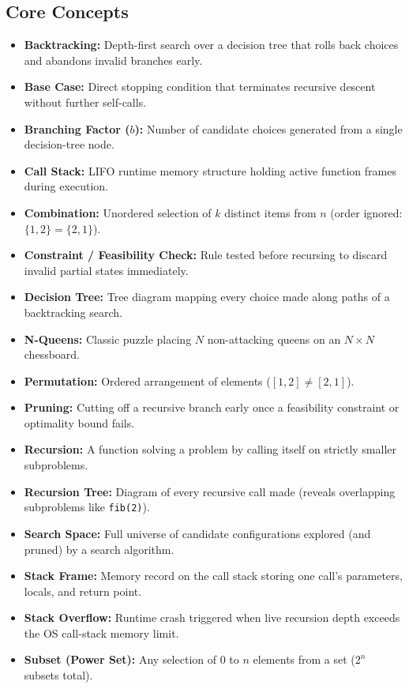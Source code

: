 \documentclass[11pt,a4paper]{article}
\theoremstyle{definition}
\begin{document}
\subsection*{Core Concepts}
\begin{itemize}
    \item \textbf{Backtracking:} Depth-first search over a decision tree that rolls back choices and abandons invalid branches early.
    \item \textbf{Base Case:} Direct stopping condition that terminates recursive descent without further self-calls.
    \item \textbf{Branching Factor ($b$):} Number of candidate choices generated from a single decision-tree node.
    \item \textbf{Call Stack:} LIFO runtime memory structure holding active function frames during execution.
    \item \textbf{Combination:} Unordered selection of $k$ distinct items from $n$ (order ignored: $\{1, 2\} = \{2, 1\}$).
    \item \textbf{Constraint / Feasibility Check:} Rule tested before recursing to discard invalid partial states immediately.
    \item \textbf{Decision Tree:} Tree diagram mapping every choice made along paths of a backtracking search.
    \item \textbf{N-Queens:} Classic puzzle placing $N$ non-attacking queens on an $N \times N$ chessboard.
    \item \textbf{Permutation:} Ordered arrangement of elements ($[1, 2] \neq [2, 1]$).
    \item \textbf{Pruning:} Cutting off a recursive branch early once a feasibility constraint or optimality bound fails.
    \item \textbf{Recursion:} A function solving a problem by calling itself on strictly smaller subproblems.
    \item \textbf{Recursion Tree:} Diagram of every recursive call made (reveals overlapping subproblems like \texttt{fib(2)}).
    \item \textbf{Search Space:} Full universe of candidate configurations explored (and pruned) by a search algorithm.
    \item \textbf{Stack Frame:} Memory record on the call stack storing one call's parameters, locals, and return point.
    \item \textbf{Stack Overflow:} Runtime crash triggered when live recursion depth exceeds the OS call-stack memory limit.
    \item \textbf{Subset (Power Set):} Any selection of $0$ to $n$ elements from a set ($2^n$ subsets total).
\end{itemize}
\end{document}
